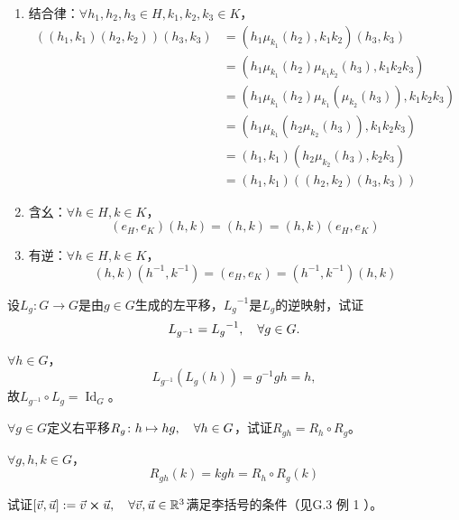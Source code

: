 \begin{xiti}
    \begin{zm}
    	\begin{enumerate}
    		\item 结合律：$\forall h_1 , h_2 , h_3 \in H , k_1 , k_2 , k_3 \in K $，
    		\begin{align*}
    		\left( (h_1,k_1) (h_2,k_2) \right) (h_3 , k_3) &= \left(h_1 \mu_{k_1}(h_2), k_1 k_2 \right) (h_3,k_3)\\
    		&= \left( h_1 \mu_{k_1}(h_2) \mu_{k_1 k_2}(h_3) , k_1 k_2 k_3 \right)\\
    		&= \left( h_1 \mu_{k_1}(h_2) \mu_{k_1}\left( \mu_{k_2}(h_3) \right)  , k_1 k_2 k_3 \right)\\
    		&= \left( h_1 \mu_{k_1}(h_2 \mu_{k_2}(h_3)) , k_1 k_2 k_3 \right)\\
    		&= (h_1,k_1) \left( h_2 \mu_{k_2}(h_3) , k_2 k_3 \right)\\
    		&= (h_1,k_1) \left( (h_2,k_2) (h_3,k_3) \right)
    		\end{align*}
    		\item 含幺：$\forall h \in H, k\in K $，
    		\[ (e_H,e_K) (h,k) = (h,k) = (h,k) (e_H,e_K) \]
    		\item 有逆：$\forall h \in H,k \in K $，
    		\[ (h,k) (h^{-1},k^{-1}) = (e_H,e_K) = (h^{-1} ,k^{-1}) (h,k) \]
    	\end{enumerate}
    \end{zm}

	\item 设$L_g \colon G \rightarrow G $是由$g\in G $生成的左平移，${L_g}^{-1} $是$L_g$的逆映射，试证\[ L_{g^{-1}} = {L_g}^{-1}\qc \forall g\in G. \]

	\begin{zm}
		$\forall h\in G $，
		\[ L_{g^{-1}} \left(L_g(h)\right) = g^{-1} gh=h, \]
		故$L_{g^{-1}} \circ L_{g} =\operatorname{Id}_G $。
	\end{zm}

	\item $\forall g \in G $定义右平移$ R_g \colon h \mapsto hg \qc{\forall h \in G} $，试证$R_{gh} = R_{h} \circ R_g $。

	\begin{zm}
		$\forall g,h,k\in G$，\[ R_{gh}(k) = kgh=R_{h}\circ R_g (k) \]
	\end{zm}

    \item 试证$[\myvec{v},\myvec{u}]:= \myvec{v} \cp \myvec{u} \qc \forall \myvec{v} ,\myvec{u} \in \mathbb{R}^3 $满足李括号的条件（见\textsection G.3 例 1 ）。


\end{xiti}
